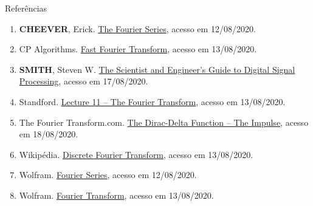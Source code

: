 \begin{frame}[fragile]{Referências}

    \begin{enumerate}
        \item \textbf{CHEEVER}, Erick. \href{https://lpsa.swarthmore.edu/Fourier/Series/WhyFS.html}
            {The Fourier Series}, acesso em 12/08/2020.

        \item CP Algorithms. \href{https://cp-algorithms.com/algebra/fft.html}{Fast Fourier
            Transform}, acesso em 13/08/2020.
 
        \item \textbf{SMITH}, Steven W. \href{https://www.dspguide.com/ch12/2.htm}{The Scientist
            and Engineer's Guide to Digital Signal Processing}, acesso em 17/08/2020.
 
        \item Standford. \href{https://web.stanford.edu/class/ee102/lectures/fourtran}{Lecture 11
            -- The Fourier Transform}, acesso em 13/08/2020.

        \item The Fourier Transform.com. \href{http://www.thefouriertransform.com/pairs/impulse.php}{The Dirac-Delta Function -- The Impulse}, acesso em 18/08/2020.

        \item Wikipédia. \href{https://en.wikipedia.org/wiki/Discrete_Fourier_transform}{Discrete
            Fourier Transform}, acesso em 13/08/2020.
 
        \item Wolfram. \href{https://mathworld.wolfram.com/FourierSeries.html}{Fourier Series},
            acesso em 12/08/2020.

        \item Wolfram. \href{https://mathworld.wolfram.com/FourierTransform.html}{Fourier
            Transform}, acesso em 13/08/2020.
 

    \end{enumerate}

\end{frame}
